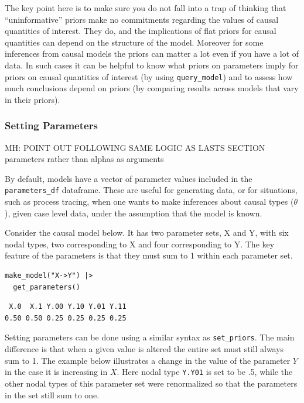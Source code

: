 \documentclass[
  article]{jss}
\begin{document}
The key point here is to make sure you do not fall into a trap of
thinking that ``uninformative'' priors make no commitments regarding the
values of causal quantities of interest. They do, and the implications
of flat priors for causal quantities can depend on the structure of the
model. Moreover for some inferences from causal models the priors can
matter a lot even if you have a lot of data. In such cases it can be
helpful to know what priors on parameters imply for priors on causal
quantities of interest (by using \texttt{query\_model}) and to assess
how much conclusions depend on priors (by comparing results across
models that vary in their priors).

\hypertarget{parameters}{%
\subsubsection{Setting Parameters}\label{parameters}}

MH: POINT OUT FOLLOWING SAME LOGIC AS LASTS SECTION parameters rather
than alphas as arguments

By default, models have a vector of parameter values included in the
\texttt{parameters\_df} dataframe. These are useful for generating data,
or for situations, such as process tracing, when one wants to make
inferences about causal types (\(\theta\)), given case level data, under
the assumption that the model is known.

Consider the causal model below. It has two parameter sets, X and Y,
with six nodal types, two corresponding to X and four corresponding to
Y. The key feature of the parameters is that they must sum to 1 within
each parameter set.

\begin{verbatim}
make_model("X->Y") |> 
  get_parameters()
\end{verbatim}

\begin{verbatim}
 X.0  X.1 Y.00 Y.10 Y.01 Y.11 
0.50 0.50 0.25 0.25 0.25 0.25 
\end{verbatim}

Setting parameters can be done using a similar syntax as
\texttt{set\_priors}. The main difference is that when a given value is
altered the entire set must still always sum to 1. The example below
illustrates a change in the value of the parameter \(Y\) in the case it
is increasing in \(X\). Here nodal type \texttt{Y.Y01} is set to be .5,
while the other nodal types of this parameter set were renormalized so
that the parameters in the set still sum to one.
\end{document}
